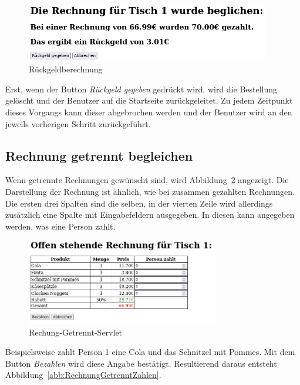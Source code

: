 \begin{figure}[htb]
  \centering
  \includegraphics[width=0.95\textwidth]{images/RechnungZusammenBarServlet.png}
  \caption[Rückgeldberechnung]{Rückgeldberechnung}
  \label{abb:BarZusammen}
\end{figure}

Erst, wenn der Button \textit{Rückgeld gegeben} gedrückt wird, wird die Bestellung gelöscht und der Benutzer auf die Startseite zurückgeleitet.
Zu jedem Zeitpunkt dieses Vorgangs kann dieser abgebrochen werden und der Benutzer wird an den jeweils vorherigen Schritt zurückgeführt.


\subsection{Rechnung getrennt begleichen} %
\label{sub:Rechnung getrennt begleichen}

Wenn getrennte Rechnungen gewünscht sind, wird Abbildung~\ref{abb:RechnungGetrennt} angezeigt.
Die Darstellung der Rechnung ist ähnlich, wie bei zusammen gezahlten Rechnungen.
Die ersten drei Spalten sind die selben, in der vierten Zeile wird allerdings zusätzlich eine Spalte mit Eingabefeldern ausgegeben.
In diesen kann angegeben werden, was eine Person zahlt.

\begin{figure}[htb]
  \centering
  \includegraphics[width=0.75\textwidth]{images/RechnungGetrenntServlet.png}
  \caption[Rechung-Getrennt-Servlet]{Rechung-Getrennt-Servlet}
  \label{abb:RechnungGetrennt}
\end{figure}

Beispielsweise zahlt Person 1 eine Cola und das Schnitzel mit Pommes.
Mit dem Button \textit{Bezahlen} wird diese Angabe bestätigt.
Resultierend daraus entsteht Abbildung~\ref{abb:RechnungGetrenntZahlen}.

